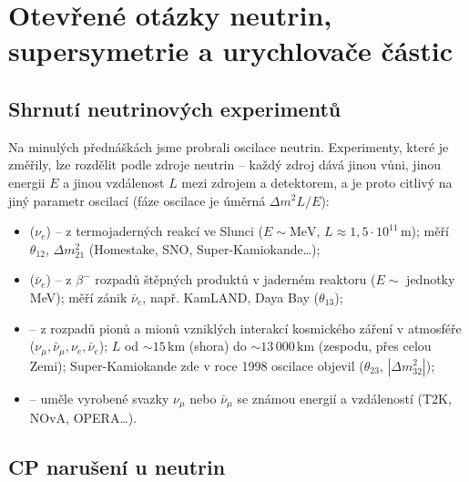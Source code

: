 \section{Otevřené otázky neutrin, supersymetrie a urychlovače částic}

\subsection{Shrnutí neutrinových experimentů}

Na minulých přednáškách jsme probrali oscilace neutrin. Experimenty, které je změřily, lze
rozdělit podle zdroje neutrin -- každý zdroj dává jinou vůni, jinou energii \(E\) a jinou
vzdálenost \(L\) mezi zdrojem a detektorem, a je proto citlivý na jiný parametr oscilací
(fáze oscilace je úměrná \(\Delta m^2 L/E\)):
\begin{itemize}[nosep]
  \item {} (\(\nu_e\)) -- z termojaderných reakcí ve Slunci (\(E\sim\mathrm{MeV}\),
        \(L\approx 1{,}5\cdot10^{11}\,\mathrm{m}\)); měří \(\theta_{12}\), \(\Delta m^2_{21}\)
        (Homestake, SNO, Super-Kamiokande\dots);
  \item {} (\(\bar\nu_e\)) -- z \(\beta^-\) rozpadů štěpných produktů v jaderném
        reaktoru (\(E\sim\) jednotky MeV); měří zánik \(\bar\nu_e\), např. KamLAND, Daya Bay
        (\(\theta_{13}\));
  \item {} -- z rozpadů pionů a mionů vzniklých interakcí kosmického záření v
        atmosféře (\(\nu_\mu,\bar\nu_\mu,\nu_e,\bar\nu_e\)); \(L\) od \(\sim 15\,\mathrm{km}\)
        (shora) do \(\sim 13\,000\,\mathrm{km}\) (zespodu, přes celou Zemi); Super-Kamiokande
        zde v roce 1998 oscilace objevil (\(\theta_{23}\), \(|\Delta m^2_{32}|\));
  \item {} -- uměle vyrobené svazky \(\nu_\mu\) nebo \(\bar\nu_\mu\) se známou energií
        a vzdáleností (T2K, NOvA, OPERA\dots).
\end{itemize}

\subsection{CP narušení u neutrin}

